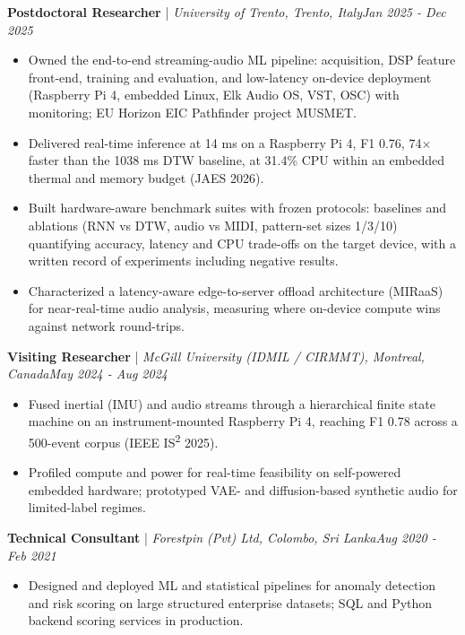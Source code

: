 \documentclass[11pt]{article}
\newenvironment{cvrole}[5]{%
  \par\noindent\textbf{\large #1} | \textit{\small #2, #3}\hfill \textit{\small #4 - #5}\par
  \begin{itemize}[leftmargin=2em, itemsep=-0.3em, topsep=-0.5em]%
}{%
  \end{itemize}\par\noindent\mbox{}\par\vspace{0.1em}%
}
\begin{document}
\begin{cvrole}{Postdoctoral Researcher}{University of Trento}{Trento, Italy}{Jan 2025}{Dec 2025}
    \item Owned the end-to-end streaming-audio ML pipeline: acquisition, DSP feature front-end, training and evaluation, and low-latency on-device deployment (Raspberry Pi 4, embedded Linux, Elk Audio OS, VST, OSC) with monitoring; EU Horizon EIC Pathfinder project MUSMET.
    \item Delivered real-time inference at 14 ms on a Raspberry Pi 4, F1 0.76, 74$\times$ faster than the 1038 ms DTW baseline, at 31.4\% CPU within an embedded thermal and memory budget (JAES 2026).
    \item Built hardware-aware benchmark suites with frozen protocols: baselines and ablations (RNN vs DTW, audio vs MIDI, pattern-set sizes 1/3/10) quantifying accuracy, latency and CPU trade-offs on the target device, with a written record of experiments including negative results.
    \item Characterized a latency-aware edge-to-server offload architecture (MIRaaS) for near-real-time audio analysis, measuring where on-device compute wins against network round-trips.
\end{cvrole}

\begin{cvrole}{Visiting Researcher}{McGill University (IDMIL / CIRMMT)}{Montreal, Canada}{May 2024}{Aug 2024}
    \item Fused inertial (IMU) and audio streams through a hierarchical finite state machine on an instrument-mounted Raspberry Pi 4, reaching F1 0.78 across a 500-event corpus (IEEE IS\textsuperscript{2} 2025).
    \item Profiled compute and power for real-time feasibility on self-powered embedded hardware; prototyped VAE- and diffusion-based synthetic audio for limited-label regimes.
\end{cvrole}

\begin{cvrole}{Technical Consultant}{Forestpin (Pvt) Ltd}{Colombo, Sri Lanka}{Aug 2020}{Feb 2021}
    \item Designed and deployed ML and statistical pipelines for anomaly detection and risk scoring on large structured enterprise datasets; SQL and Python backend scoring services in production.
\end{cvrole}
\end{document}
